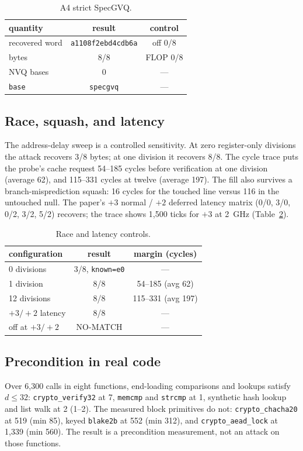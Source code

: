 \documentclass[conference]{IEEEtran}
\newcommand{\code}[1]{\texttt{\small #1}}
\begin{document}
\begin{table}[h]
\centering\small
\caption{A4 strict SpecGVQ.}
\label{tab:a4}
\begin{tabular}{@{}lcc@{}}
\toprule
quantity & result & control\\
\midrule
recovered word & \code{a1108f2ebd4cdb6a} & off 0/8\\
bytes & 8/8 & FLOP 0/8\\
NVQ bases & 0 & ---\\
\code{base} & \code{specgvq} & ---\\
\bottomrule
\end{tabular}
\end{table}

\subsection{Race, squash, and latency}
The address-delay sweep is a controlled sensitivity. At zero
register-only divisions the attack recovers 3/8 bytes; at one division
it recovers 8/8. The cycle trace puts the probe's cache request
54--185 cycles before verification at one division (average 62), and
115--331 cycles at twelve (average 197). The fill also survives a
branch-misprediction squash: 16 cycles for the touched line versus 116 in
the untouched null. The paper's $+3$ normal / $+2$ deferred latency
matrix (0/0, 3/0, 0/2, 3/2, 5/2) recovers; the trace shows 1,500 ticks
for $+3$ at 2~GHz (Table~\ref{tab:race}).

\begin{table}[h]
\centering\small
\caption{Race and latency controls.}
\label{tab:race}
\begin{tabular}{@{}lcc@{}}
\toprule
configuration & result & margin (cycles)\\
\midrule
0 divisions & 3/8, \code{known=e0} & ---\\
1 division & 8/8 & 54--185 (avg 62)\\
12 divisions & 8/8 & 115--331 (avg 197)\\
$+3/+2$ latency & 8/8 & ---\\
off at $+3/+2$ & NO-MATCH & ---\\
\bottomrule
\end{tabular}
\end{table}

\subsection{Precondition in real code}
Over 6,300 calls in eight functions, end-loading comparisons and
lookups satisfy $d\le 32$: \code{crypto\_verify32} at 7, \code{memcmp}
and \code{strcmp} at 1, synthetic hash lookup and list walk at 2 (1--2).
The measured block primitives do not: \code{crypto\_chacha20} at 519
(min 85), keyed \code{blake2b} at 552 (min 312), and
\code{crypto\_aead\_lock} at 1,339 (min 560). The result is a
precondition measurement, not an attack on those functions.
\end{document}
